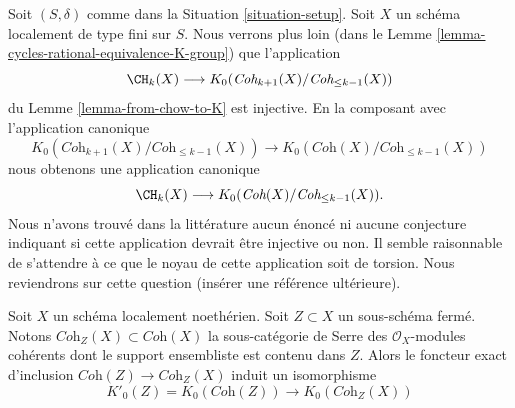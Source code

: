 \begin{remark}
\label{remark-good-cases-K-A}
Soit $(S, \delta)$ comme dans la Situation \ref{situation-setup}.
Soit $X$ un schéma localement de type fini sur $S$.
Nous verrons plus loin (dans le Lemme \ref{lemma-cycles-rational-equivalence-K-group})
que l'application
$$
\CH_k(X)
\longrightarrow
K_0(\textit{Coh}_{k + 1}(X)/\textit{Coh}_{\leq k - 1}(X))
$$
du Lemme \ref{lemma-from-chow-to-K} est injective.
En la composant avec l'application canonique
$$
K_0(\textit{Coh}_{k + 1}(X)/\textit{Coh}_{\leq k - 1}(X))
\longrightarrow
K_0(\textit{Coh}(X)/\textit{Coh}_{\leq k - 1}(X))
$$
nous obtenons une application canonique
$$
\CH_k(X)
\longrightarrow
K_0(\textit{Coh}(X)/\textit{Coh}_{\leq k - 1}(X)).
$$
Nous n'avons trouvé dans la littérature aucun énoncé ni aucune conjecture
indiquant si cette application devrait être injective ou non.
Il semble raisonnable de s'attendre à ce que le noyau de cette application soit de torsion.
Nous reviendrons sur cette question (insérer une référence ultérieure).
\end{remark}

\begin{lemma}
\label{lemma-K-coherent-supported-on-closed}
Soit $X$ un schéma localement noethérien. Soit $Z \subset X$ un sous-schéma
fermé. Notons $\textit{Coh}_Z(X) \subset \textit{Coh}(X)$
la sous-catégorie de Serre des $\mathcal{O}_X$-modules cohérents dont le
support ensembliste est contenu dans $Z$. Alors le foncteur exact d'inclusion
$\textit{Coh}(Z) \to \textit{Coh}_Z(X)$ induit
un isomorphisme
$$
K'_0(Z) = K_0(\textit{Coh}(Z)) \longrightarrow K_0(\textit{Coh}_Z(X))
$$
\end{lemma}

